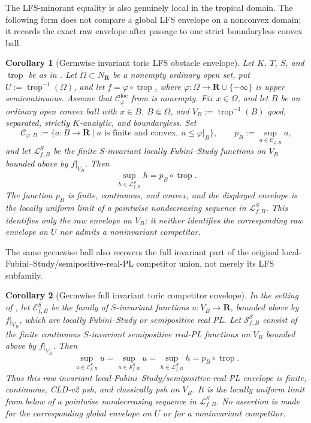 \documentclass[11pt,a4paper]{article}
\newtheorem{corollary}[corollary]{Corollary}
\theoremstyle{definition}
\theoremstyle{remark}
\begin{document}
The LFS-minorant equality is also genuinely local in the tropical domain.
The following form does not compare a global LFS envelope on a nonconvex
domain; it records the exact raw envelope after passage to one strict
boundaryless convex ball.
\begin{corollary}[Germwise invariant toric LFS obstacle envelope]
\label{cor:p033-invariant-toric-germwise-lfs-envelope}
Let \(K\), \(T\), \(S\), and \(\operatorname{trop}\) be as in
.  Let
\(\Omega\subset N_{\mathbf R}\) be a nonempty ordinary open set, put
\(U:=\operatorname{trop}^{-1}(\Omega)\), and let
\(f=\varphi\circ\operatorname{trop}\), where
\(\varphi:\Omega\to\mathbf R\cup\{-\infty\}\) is upper semicontinuous.
Assume that \(\mathcal C^{\mathrm{loc}}_\varphi\) from
 is nonempty.  Fix
\(x\in\Omega\), and let \(B\) be an ordinary open convex ball with
\(x\in B\), \(\overline B\Subset\Omega\), and
\(V_B:=\operatorname{trop}^{-1}(B)\) good, separated, strictly
\(K\)-analytic, and boundaryless.  Set
\[
 \mathcal C_{\varphi,B}
 :=\{a:B\longrightarrow\mathbf R\mid
       a\text{ is finite and convex},\ a\leq\varphi|_B\},
 \qquad
 p_B:=\sup_{a\in\mathcal C_{\varphi,B}}a,
\]
and let \(\mathcal L^S_{f,B}\) be the finite \(S\)-invariant locally
Fubini--Study functions on \(V_B\) bounded above by \(f|_{V_B}\).  Then
\[
                  \sup_{h\in\mathcal L^S_{f,B}}h
                  =p_B\circ\operatorname{trop}.
\]
The function \(p_B\) is finite, continuous, and convex, and the displayed
envelope is the locally uniform limit of a pointwise nondecreasing sequence
in \(\mathcal L^S_{f,B}\).  This identifies only the raw envelope on
\(V_B\); it neither identifies the corresponding raw envelope on \(U\) nor
admits a noninvariant competitor.
\end{corollary}


The same germwise ball also recovers the full invariant part of the original
local-Fubini--Study/semipositive-real-PL competitor union, not merely its LFS
subfamily.
\begin{corollary}[Germwise full invariant toric competitor envelope]
\label{cor:p033-invariant-toric-germwise-full-envelope}
In the setting of
, let
\(\mathcal E^S_{f,B}\) be the family of \(S\)-invariant functions
\(u:V_B\to\mathbf R\), bounded above by \(f|_{V_B}\), which are locally
Fubini--Study or semipositive real PL.  Let \(\mathcal S^S_{f,B}\) consist
of the finite continuous \(S\)-invariant semipositive real-PL functions on
\(V_B\) bounded above by \(f|_{V_B}\).  Then
\[
 \sup_{u\in\mathcal E^S_{f,B}}u
 =\sup_{u\in\mathcal S^S_{f,B}}u
 =\sup_{h\in\mathcal L^S_{f,B}}h
 =p_B\circ\operatorname{trop}.
\]
Thus this raw invariant local-Fubini--Study/semipositive-real-PL envelope is
finite, continuous, CLD-v2 psh, and classically psh on \(V_B\).  It is the
locally uniform limit from below of a pointwise nondecreasing sequence in
\(\mathcal L^S_{f,B}\).  No assertion is made for the corresponding global
envelope on \(U\) or for a noninvariant competitor.
\end{corollary}
\end{document}
